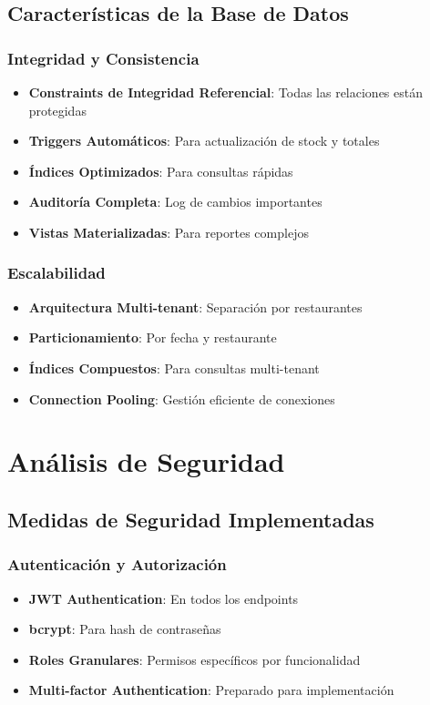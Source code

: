 \documentclass[12pt,a4paper]{article}
\begin{document}
\subsection{Características de la Base de Datos}

\subsubsection{Integridad y Consistencia}
\begin{itemize}
    \item \textbf{Constraints de Integridad Referencial}: Todas las relaciones están protegidas
    \item \textbf{Triggers Automáticos}: Para actualización de stock y totales
    \item \textbf{Índices Optimizados}: Para consultas rápidas
    \item \textbf{Auditoría Completa}: Log de cambios importantes
    \item \textbf{Vistas Materializadas}: Para reportes complejos
\end{itemize}

\subsubsection{Escalabilidad}
\begin{itemize}
    \item \textbf{Arquitectura Multi-tenant}: Separación por restaurantes
    \item \textbf{Particionamiento}: Por fecha y restaurante
    \item \textbf{Índices Compuestos}: Para consultas multi-tenant
    \item \textbf{Connection Pooling}: Gestión eficiente de conexiones
\end{itemize}

\section{Análisis de Seguridad}

\subsection{Medidas de Seguridad Implementadas}

\subsubsection{Autenticación y Autorización}
\begin{itemize}
    \item \textbf{JWT Authentication}: En todos los endpoints
    \item \textbf{bcrypt}: Para hash de contraseñas
    \item \textbf{Roles Granulares}: Permisos específicos por funcionalidad
    \item \textbf{Multi-factor Authentication}: Preparado para implementación
\end{itemize}
\end{document}

